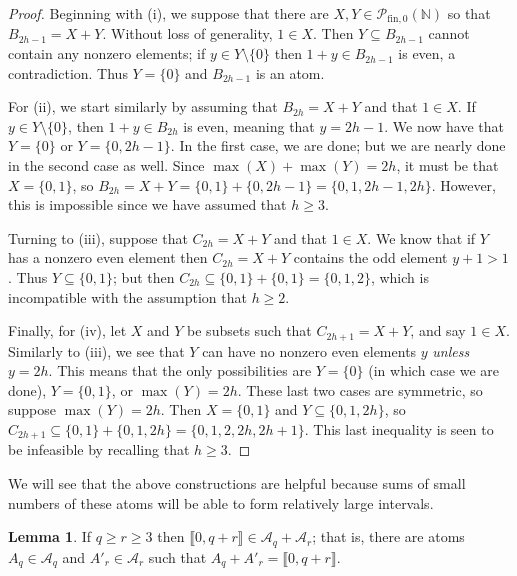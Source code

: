 \documentclass{report}
\newcommand{\A}{\mathcal{A}}
\newcommand{\NN}{\mathbb{N}}
\renewcommand{\P}{\mathcal{P}}
\newcommand{\llb}{\llbracket}
\newcommand{\rrb}{\rrbracket}
\newcommand{\fin}{\textrm{fin}}
\renewcommand{\:}{\text{:}}
\newcommand{\PN}{{\P_{\fin,0}(\NN)}}
\theoremstyle{definition}
\newtheorem{lemma}[defn]{Lemma}
\begin{document}
\begin{proof}
	Beginning with (i), we suppose that there are $X,Y\in \PN$ so that $B_{2h-1} = X + Y$.
	Without loss of generality, $1\in X$.
	Then $Y\subseteq B_{2h-1}$ cannot contain any nonzero elements; if $y\in Y\setminus\{0\}$ then $1+y\in B_{2h-1}$ is even, a contradiction.
	Thus $Y = \{0\}$ and $B_{2h-1}$ is an atom.
	
	For (ii), we start similarly by assuming that $B_{2h} = X + Y$ and that $1\in X$.
	If $y\in Y \setminus\{0\}$, then $1+y\in B_{2h}$ is even, meaning that $y = 2h-1$.
	We now have that $Y = \{0\}$ or $Y = \{0,2h-1\}$.
	In the first case, we are done; but we are nearly done in the second case as well.  
	Since $\max(X) + \max(Y) = 2h$, it must be that $X = \{0,1\}$, so $B_{2h} = X+Y = \{0,1\} + \{0,2h-1\} = \{0,1,2h-1,2h\}$.
	However, this is impossible since we have assumed that $h\ge 3$.
	
	Turning to (iii), suppose that $C_{2h} = X + Y$ and that $1\in X$.
	We know that if $Y$ has a nonzero even element then $C_{2h} = X + Y$ contains the odd element $y+1 > 1$.
	Thus $Y \subseteq \{0,1\}$; but then $C_{2h} \subseteq \{0,1\} + \{0,1\} = \{0,1,2\}$, which is incompatible with the assumption that $h\ge 2$.
	
	Finally, for (iv), let $X$ and $Y$ be subsets such that $C_{2h+1} = X + Y$, and say $1\in X$.
	Similarly to (iii), we see that $Y$ can have no nonzero even elements $y$ \textit{unless} $y=2h$.
	This means that the only possibilities are $Y = \{0\}$ (in which case we are done), $Y = \{0,1\}$, or $\max(Y) = 2h$.
	These last two cases are symmetric, so suppose $\max(Y) = 2h$.
	Then $X = \{0,1\}$ and $Y \subseteq \{0,1,2h\}$, so $C_{2h+1} \subseteq \{0,1\} + \{0,1,2h\} = \{0,1,2,2h,2h+1\}$.
	This last inequality is seen to be infeasible by recalling that $h\ge 3$.
\end{proof}

We will see that the above constructions are helpful because sums of small numbers of these atoms will be able to form relatively large intervals.

\begin{lemma} \label{lem:two-part types}
	If $q\ge r \ge 3$ then $\llb 0, q+r \rrb \in \A_q + \A_r$; that is, there are atoms $A_q\in \A_q$ and $A'_r\in \A_r$ such that $A_q + A'_r = \llb 0,q+r \rrb$.
\end{lemma}
\end{document}
